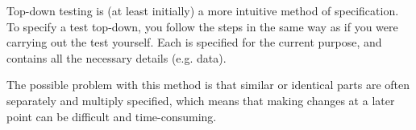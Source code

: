 
Top-down testing  is (at least initially) a more intuitive method of specification. 
To specify a test top-down, you follow the steps in the same way as if you were carrying out the test yourself. 
Each \gdstep{} is specified for the current purpose, and contains all the necessary details (e.g. data). 

The possible problem with this method is that similar or identical parts are 
often separately and multiply specified, which means that making 
changes at a later point
can be difficult and time-consuming.


